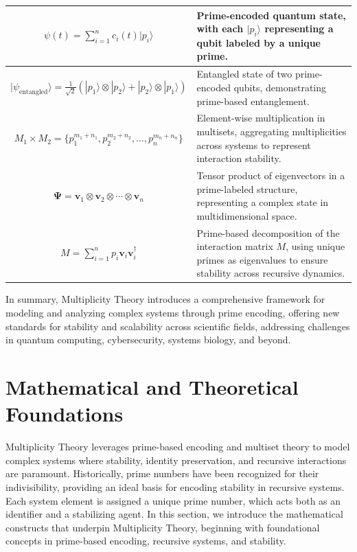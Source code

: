 \documentclass{article}
\begin{document}
\begin{table}[h]
\begin{tabular}{|c|p{10cm}|}
\hline
\( \psi(t) = \sum_{i=1}^n c_i(t) | p_i \rangle \) & Prime-encoded quantum state, with each \( | p_i \rangle \) representing a qubit labeled by a unique prime. \\
\hline
\( | \psi_{\text{entangled}} \rangle = \frac{1}{\sqrt{2}} (| p_1 \rangle \otimes | p_2 \rangle + | p_2 \rangle \otimes | p_1 \rangle) \) & Entangled state of two prime-encoded qubits, demonstrating prime-based entanglement. \\
\hline
\( M_1 \times M_2 = \{p_1^{m_1 + n_1}, p_2^{m_2 + n_2}, \ldots, p_n^{m_n + n_n}\} \) & Element-wise multiplication in multisets, aggregating multiplicities across systems to represent interaction stability. \\
\hline
\( \mathbf{\Psi} = \mathbf{v}_1 \otimes \mathbf{v}_2 \otimes \cdots \otimes \mathbf{v}_n \) & Tensor product of eigenvectors in a prime-labeled structure, representing a complex state in multidimensional space. \\
\hline
\( M = \sum_{i=1}^{n} p_i \mathbf{v}_i \mathbf{v}_i^{\dagger} \) & Prime-based decomposition of the interaction matrix \( M \), using unique primes as eigenvalues to ensure stability across recursive dynamics. \\
\hline
\end{tabular}
\label{tab:notation}
\end{table}
In summary, Multiplicity Theory introduces a comprehensive framework for modeling and analyzing complex systems through prime encoding, offering new standards for stability and scalability across scientific fields, addressing challenges in quantum computing, cybersecurity, systems biology, and beyond.

\section{Mathematical and Theoretical Foundations}

Multiplicity Theory leverages prime-based encoding and multiset theory to model complex systems where stability, identity preservation, and recursive interactions are paramount. Historically, prime numbers have been recognized for their indivisibility, providing an ideal basis for encoding stability in recursive systems. Each system element is assigned a unique prime number, which acts both as an identifier and a stabilizing agent. In this section, we introduce the mathematical constructs that underpin Multiplicity Theory, beginning with foundational concepts in prime-based encoding, recursive systems, and stability.
\end{document}
